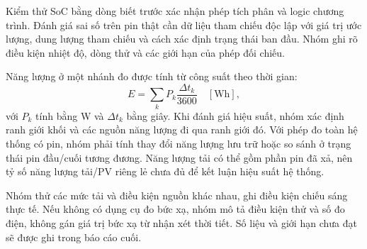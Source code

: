 Kiểm thử SoC bằng dòng biết trước xác nhận phép tích phân và logic chương trình. Đánh giá sai số trên pin thật cần dữ liệu tham chiếu độc lập với giá trị ước lượng, dung lượng tham chiếu và cách xác định trạng thái ban đầu. Nhóm ghi rõ điều kiện nhiệt độ, dòng thử và các giới hạn của phép đối chiếu.

Năng lượng ở một nhánh đo được tính từ công suất theo thời gian:
\[
E=\sum_k P_k\frac{\Delta t_k}{3600}\quad[\mathrm{Wh}],
\]
với \(P_k\) tính bằng W và \(\Delta t_k\) bằng giây. Khi đánh giá hiệu suất, nhóm xác định ranh giới khối và các nguồn năng lượng đi qua ranh giới đó. Với phép đo toàn hệ thống có pin, nhóm phải tính thay đổi năng lượng lưu trữ hoặc so sánh ở trạng thái pin đầu/cuối tương đương. Năng lượng tải có thể gồm phần pin đã xả, nên tỷ số năng lượng tải/PV riêng lẻ chưa đủ để kết luận hiệu suất hệ thống.

Nhóm thử các mức tải và điều kiện nguồn khác nhau, ghi điều kiện chiếu sáng thực tế. Nếu không có dụng cụ đo bức xạ, nhóm mô tả điều kiện thử và số đo điện, không gán giá trị bức xạ từ nhận xét thời tiết. Số liệu và giới hạn chưa đạt sẽ được ghi trong báo cáo cuối.
